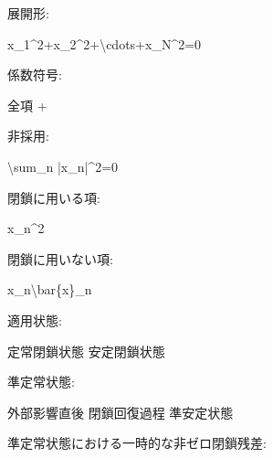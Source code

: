\documentclass[
  a4paper,
]{ltjsarticle}
\newenvironment{Shaded}{}{}
\newcommand{\NormalTok}[1]{#1}
\begin{document}
展開形:

\begin{Shaded}
\begin{Highlighting}[]
\NormalTok{x\_1\^{}2+x\_2\^{}2+\textbackslash{}cdots+x\_N\^{}2=0}
\end{Highlighting}
\end{Shaded}

係数符号:

\begin{Shaded}
\begin{Highlighting}[]
\NormalTok{全項 +}
\end{Highlighting}
\end{Shaded}

非採用:

\begin{Shaded}
\begin{Highlighting}[]
\NormalTok{\textbackslash{}sum\_n |x\_n|\^{}2=0}
\end{Highlighting}
\end{Shaded}

閉鎖に用いる項:

\begin{Shaded}
\begin{Highlighting}[]
\NormalTok{x\_n\^{}2}
\end{Highlighting}
\end{Shaded}

閉鎖に用いない項:

\begin{Shaded}
\begin{Highlighting}[]
\NormalTok{x\_n\textbackslash{}bar\{x\}\_n}
\end{Highlighting}
\end{Shaded}

適用状態:

\begin{Shaded}
\begin{Highlighting}[]
\NormalTok{定常閉鎖状態}
\NormalTok{安定閉鎖状態}
\end{Highlighting}
\end{Shaded}

準定常状態:

\begin{Shaded}
\begin{Highlighting}[]
\NormalTok{外部影響直後}
\NormalTok{閉鎖回復過程}
\NormalTok{準安定状態}
\end{Highlighting}
\end{Shaded}

準定常状態における一時的な非ゼロ閉鎖残差:
\end{document}
